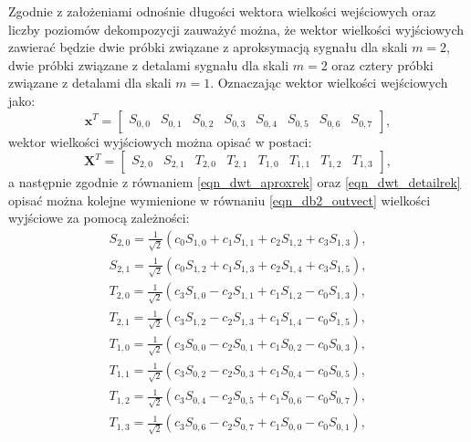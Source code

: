 Zgodnie z założeniami odnośnie długości wektora wielkości wejściowych oraz liczby poziomów dekompozycji zauważyć można, że wektor wielkości wyjściowych zawierać będzie dwie próbki związane z aproksymacją sygnału dla skali $m = 2$, dwie próbki związane z detalami sygnału dla skali $m = 2$ oraz cztery próbki związane z detalami dla skali $m = 1$. Oznaczając wektor wielkości wejściowych jako:
\begin{equation}
\mathbf{x}^{T} =
\begin{bmatrix}
S_{0,0} & S_{0,1} & S_{0,2} & S_{0,3} & S_{0,4} & S_{0,5} & S_{0,6} & S_{0,7}
\end{bmatrix}
\label{eqn_db2_invect},
\end{equation}
wektor wielkości wyjściowych można opisać w postaci:
\begin{equation}
\mathbf{X}^{T} =
\begin{bmatrix}
S_{2,0} & S_{2,1} & T_{2,0} & T_{2,1} & T_{1,0} & T_{1,1} & T_{1,2} & T_{1,3}
\end{bmatrix}
\label{eqn_db2_outvect},
\end{equation}
a następnie zgodnie z równaniem \eqref{eqn_dwt_aproxrek} oraz \eqref{eqn_dwt_detailrek} opisać można kolejne wymienione w równaniu \eqref{eqn_db2_outvect} wielkości wyjściowe za pomocą zależności:
\begin{gather}
S_{2,0} = \frac{1}{\sqrt{2}} \left( c_0 S_{1,0} + c_1 S_{1,1} + c_2 S_{1,2} + c_3 S_{1,3} \right) \label{eqn_db2_outvect_s_2_0}, \\
S_{2,1} = \frac{1}{\sqrt{2}} \left( c_0 S_{1,2} + c_1 S_{1,3} + c_2 S_{1,4} + c_3 S_{1,5} \right) \label{eqn_db2_outvect_s_2_1}, \\
T_{2,0} = \frac{1}{\sqrt{2}} \left( c_3 S_{1,0} - c_2 S_{1,1} + c_1 S_{1,2} - c_0 S_{1,3} \right) \label{eqn_db2_outvect_t_2_0}, \\
T_{2,1} = \frac{1}{\sqrt{2}} \left( c_3 S_{1,2} - c_2 S_{1,3} + c_1 S_{1,4} - c_0 S_{1,5} \right) \label{eqn_db2_outvect_t_2_1}, \\
T_{1,0} = \frac{1}{\sqrt{2}} \left( c_3 S_{0,0} - c_2 S_{0,1} + c_1 S_{0,2} - c_0 S_{0,3} \right) \label{eqn_db2_outvect_t_1_0}, \\
T_{1,1} = \frac{1}{\sqrt{2}} \left( c_3 S_{0,2} - c_2 S_{0,3} + c_1 S_{0,4} - c_0 S_{0,5} \right) \label{eqn_db2_outvect_t_1_1}, \\
T_{1,2} = \frac{1}{\sqrt{2}} \left( c_3 S_{0,4} - c_2 S_{0,5} + c_1 S_{0,6} - c_0 S_{0,7} \right) \label{eqn_db2_outvect_t_1_2}, \\
T_{1,3} = \frac{1}{\sqrt{2}} \left( c_3 S_{0,6} - c_2 S_{0,7} + c_1 S_{0,0} - c_0 S_{0,1} \right) \label{eqn_db2_outvect_t_1_3},
\end{gather}
